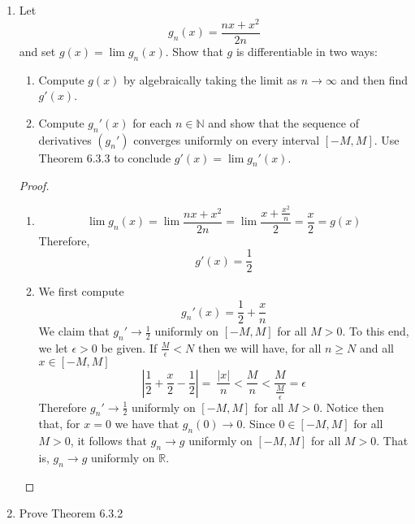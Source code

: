\begin{enumerate}
    \item Let 
    \[
    g_n(x) = \frac{nx+x^2}{2n}
    \]
    and set \( g(x) = \lim g_n(x) \). Show that \( g \) is differentiable in two ways:
    \begin{enumerate}
        \item Compute \( g(x) \) by algebraically taking the limit as \( n \rightarrow \infty \) and then find \( g'(x) \).
        
        \item Compute \( g_n'(x) \) for each \( n \in \mathbb{N} \) and show that the sequence of derivatives \( (g_n') \) converges uniformly on every interval \( [-M,M] \). Use Theorem 6.3.3 to conclude \( g'(x) = \lim g_n'(x) \).
    \end{enumerate}
    
    \begin{proof}
    \begin{enumerate}
        \item \[
        \lim g_n(x) = \lim \frac{nx + x^2}{2n} = \lim \frac{x + \frac{x^2}{n}}{2} = \frac{x}{2} = g(x)
        \]
        Therefore,
        \[
        g'(x) = \frac{1}{2}
        \]
        
        \item We first compute
        \[
        g_n'(x) = \frac{1}{2} + \frac{x}{n}
        \]
        We claim that \( g_n' \rightarrow \frac{1}{2} \) uniformly on \( [-M,M] \) for all \( M > 0 \). To this end, we let \( \epsilon > 0 \) be given. If \( \frac{M}{\epsilon} < N \) then we will have, for all \( n \geq N \) and all \( x \in [-M, M ] \)
        \[
        \left| \frac{1}{2} + \frac{x}{2} - \frac{1}{2} \right| =  \ \frac{\vert x \vert}{n} < \frac{M}{n} < \frac{M}{\frac{M}{\epsilon}} = \epsilon
        \]
        Therefore \( g_n' \rightarrow \frac{1}{2} \) uniformly on \( [-M,M] \) for all \( M > 0 \). Notice then that, for \( x= 0 \) we have that \( g_n(0) \rightarrow 0 \). Since \( 0 \in [-M,M] \) for all \( M > 0 \), it follows that \( g_n \rightarrow g \) uniformly on \( [-M, M ] \) for all \( M > 0 \). That is, \( g_n \rightarrow g \) uniformly on \( \mathbb{R} \). 
    \end{enumerate}
    \end{proof}
    
    \item Prove Theorem 6.3.2
    

\end{enumerate}
